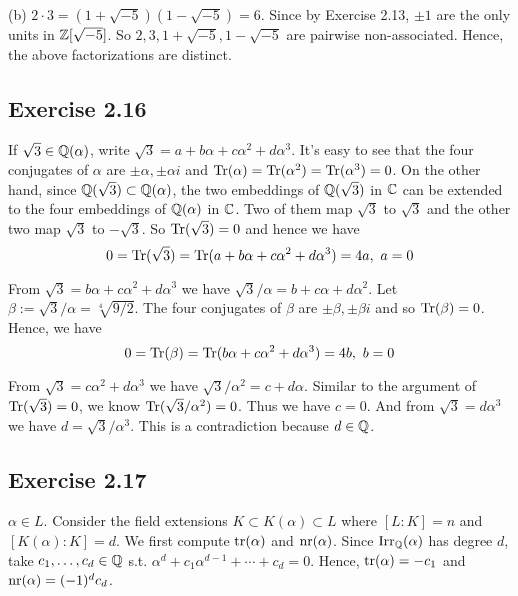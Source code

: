 \documentclass[../Marcus.tex]{subfiles}
\begin{document}
(b) $2\cdot3=(1+\sqrt{-5})(1-\sqrt{-5})=6$. Since by Exercise 2.13, $\pm1$ are the only units in $\mathbb{Z}[\sqrt{-5}]$. So $2,3,1+\sqrt{-5},1-\sqrt{-5}$ are pairwise non-associated. Hence, the above factorizations are distinct.

\subsection*{Exercise 2.16}

If $\sqrt{3}\in\mathbb{Q}(\alpha)$, write $\sqrt{3}=a+b\alpha+c\alpha^2+d\alpha^3$. It's easy to see that the four conjugates of $\alpha$ are $\pm\alpha,\pm\alpha i$ and $\operatorname{Tr}(\alpha)=\operatorname{Tr}(\alpha^2)=\operatorname{Tr}(\alpha^3)=0$. On the other hand, since $\mathbb{Q}(\sqrt{3})\subset\mathbb{Q}(\alpha)$, the two embeddings of $\mathbb{Q}(\sqrt{3})$ in $\mathbb{C}$ can be extended to the four embeddings of $\mathbb{Q}(\alpha)$ in $\mathbb{C}$. Two of them map $\sqrt{3}$ to $\sqrt{3}$ and the other two map $\sqrt{3}$ to $-\sqrt{3}$. So $\operatorname{Tr}(\sqrt{3})=0$ and hence we have $$0=\operatorname{Tr}(\sqrt{3})=\operatorname{Tr}(a+b\alpha+c\alpha^2+d\alpha^3)=4a, \ a=0$$

From $\sqrt{3}=b\alpha+c\alpha^2+d\alpha^3$ we have $\sqrt{3}/\alpha=b+c\alpha+d\alpha^2$. Let $\beta:=\sqrt{3}/\alpha=\sqrt[4]{9/2}$. The four conjugates of $\beta$ are $\pm\beta,\pm\beta i$ and so $\operatorname{Tr}(\beta)=0$. Hence, we have $$0=\operatorname{Tr}(\beta)=\operatorname{Tr}(b\alpha+c\alpha^2+d\alpha^3)=4b, \ b=0$$

From  $\sqrt{3}=c\alpha^2+d\alpha^3$ we have $\sqrt{3}/\alpha^2=c+d\alpha$. Similar to the argument of $\operatorname{Tr}(\sqrt{3})=0$, we know $\operatorname{Tr}(\sqrt{3}/\alpha^2)=0$. Thus we have $c=0$. And from $\sqrt{3}=d\alpha^3$ we have $d=\sqrt{3}/\alpha^3$. This is a contradiction because $d\in\mathbb{Q}$.

\subsection*{Exercise 2.17}

$\alpha\in L$. Consider the field extensions $K\subset K(\alpha)\subset L$ where $[L:K]=n$ and $[K(\alpha):K]=d$. We first compute $\operatorname{tr}(\alpha)$ and $\operatorname{nr}(\alpha)$. Since $\operatorname{Irr}_{\mathbb{Q}}(\alpha)$ has degree $d$, take $c_1,\ldots,c_d\in\mathbb{Q}$ s.t. $\alpha^d+c_1\alpha^{d-1}+\cdots+c_d=0$. Hence, $\operatorname{tr}(\alpha)=-c_1$ and $\operatorname{nr}(\alpha)=(-1)^{d}c_d$.
\end{document}
